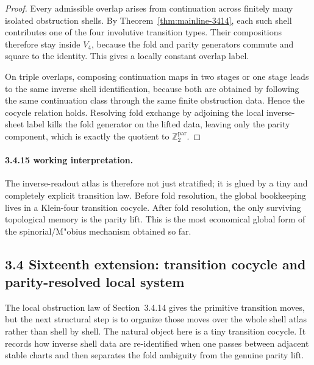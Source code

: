 \begin{proof}
Every admissible overlap arises from continuation across finitely many isolated obstruction shells. By Theorem~\ref{thm:mainline-3414}, each such shell contributes one of the four involutive transition types. Their compositions therefore stay inside $V_4$, because the fold and parity generators commute and square to the identity. This gives a locally constant overlap label.

On triple overlaps, composing continuation maps in two stages or one stage leads to the same inverse shell identification, because both are obtained by following the same continuation class through the same finite obstruction data. Hence the cocycle relation holds. Resolving fold exchange by adjoining the local inverse-sheet label kills the fold generator on the lifted data, leaving only the parity component, which is exactly the quotient to $\mathbb Z_2^{\mathrm{par}}$.
\end{proof}

\paragraph{3.4.15 working interpretation.}
The inverse-readout atlas is therefore not just stratified; it is glued by a tiny and completely explicit transition law. Before fold resolution, the global bookkeeping lives in a Klein-four transition cocycle. After fold resolution, the only surviving topological memory is the parity lift. This is the most economical global form of the spinorial/M"obius mechanism obtained so far.




\subsection*{3.4 Sixteenth extension: transition cocycle and parity-resolved local system}
The local obstruction law of Section~3.4.14 gives the primitive transition moves, but the next structural step is to organize those moves over the whole shell atlas rather than shell by shell. The natural object here is a tiny transition cocycle. It records how inverse shell data are re-identified when one passes between adjacent stable charts and then separates the fold ambiguity from the genuine parity lift.

